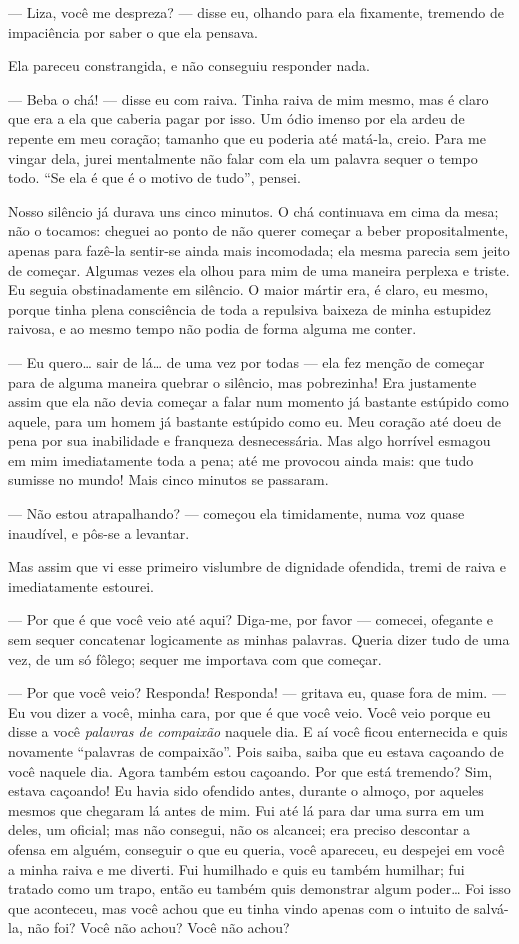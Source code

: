 --- Liza, você me despreza? --- disse eu, olhando para ela fixamente,
tremendo de impaciência por saber o que ela pensava.

Ela pareceu constrangida, e não conseguiu responder nada.

--- Beba o chá! --- disse eu com raiva. Tinha raiva de mim mesmo, mas é
claro que era a ela que caberia pagar por isso. Um ódio imenso por ela
ardeu de repente em meu coração; tamanho que eu poderia até matá-la,
creio. Para me vingar dela, jurei mentalmente não falar com ela um
palavra sequer o tempo todo. “Se ela é que é o motivo de tudo”, pensei.

Nosso silêncio já durava uns cinco minutos. O chá continuava em cima da
mesa; não o tocamos: cheguei ao ponto de não querer começar a beber
propositalmente, apenas para fazê-la sentir-se ainda mais incomodada; ela
mesma parecia sem jeito de começar. Algumas vezes ela olhou para mim de
uma maneira perplexa e triste. Eu seguia obstinadamente em silêncio. O
maior mártir era, é claro, eu mesmo, porque tinha plena consciência de
toda a repulsiva baixeza de minha estupidez raivosa, e ao mesmo tempo
não podia de forma alguma me conter.

--- Eu quero\ldots{} sair de lá\ldots{} de uma vez por todas --- ela fez menção de
começar para de alguma maneira quebrar o silêncio, mas pobrezinha! Era
justamente assim que ela não devia começar a falar num momento já
bastante estúpido como aquele, para um homem já bastante estúpido como
eu. Meu coração até doeu de pena por sua inabilidade e franqueza
desnecessária. Mas algo horrível esmagou em mim imediatamente toda a
pena; até me provocou ainda mais: que tudo sumisse no mundo! Mais cinco
minutos se passaram.

--- Não estou atrapalhando? --- começou ela timidamente, numa voz quase
inaudível, e pôs-se a levantar.

Mas assim que vi esse primeiro vislumbre de dignidade ofendida, tremi de
raiva e imediatamente estourei.

--- Por que é que você veio até aqui? Diga-me, por favor --- comecei,
ofegante e sem sequer concatenar logicamente as minhas palavras. Queria
dizer tudo de uma vez, de um só fôlego; sequer me importava com que
começar.

--- Por que você veio? Responda! Responda! --- gritava eu, quase fora de mim.
--- Eu vou dizer a você, minha cara, por que é que você veio. Você veio porque
eu disse a você \textit{palavras de compaixão} naquele dia. E aí você ficou
enternecida e quis novamente “palavras de compaixão”. Pois saiba, saiba que eu
estava caçoando de você naquele dia. Agora também estou caçoando. Por que está
tremendo? Sim, estava caçoando! Eu havia sido ofendido antes, durante o almoço,
por aqueles mesmos que chegaram lá antes de mim. Fui até lá para dar uma surra em um
deles, um oficial; mas não consegui, não os alcancei; era preciso descontar a
ofensa em alguém, conseguir o que eu queria, você apareceu, eu despejei em você
a minha raiva e me diverti. Fui humilhado e quis eu também humilhar; fui
tratado como um trapo, então eu também quis demonstrar algum poder\ldots{} Foi
isso que aconteceu, mas você achou que eu tinha vindo apenas com o intuito de
salvá-la, não foi? Você não achou? Você não achou?

